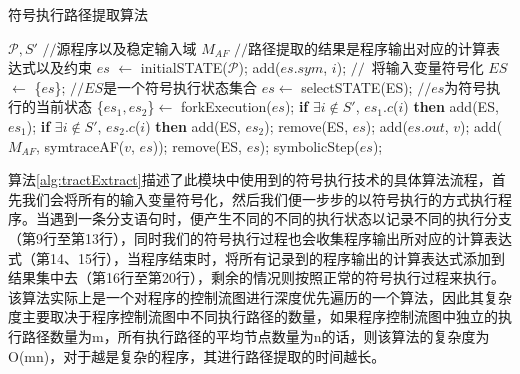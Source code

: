 \begin{algorithm}[thb]
  \caption{符号执行路径提取算法}
  \label{alg:tractExtract}
\begin{algorithmic}[1]
\REQUIRE $\mathcal{P}, S'$ \hfill {{\footnotesize$//$}\small  源程序以及稳定输入域}
\ENSURE $M_{AF}$ \hfill {{\footnotesize$//$}\small 路径提取的结果是程序输出对应的计算表达式以及约束} %
    \STATE $es$ $\leftarrow$ initialSTATE($\mathcal{P}$);
      \STATE add($es.sym$, $i$); \hfill {{\footnotesize$//$}\small\ 将输入变量符号化} \label{alg:tractExtract:input}
    \ENDFOR
    \STATE $ES$ $\leftarrow$ \{$es$\}; \hfill {{\footnotesize$//$}\small $ES$是一个符号执行状态集合}
     \label{alg:tractExtract:iter}
      \STATE $es \leftarrow$ selectSTATE(ES); \label{alg:tractExtract:select}  \hfill {{\footnotesize$//$}\small $es$为符号执行的当前状态}
        \STATE \{$es_1,es_2$\}$\leftarrow$ forkExecution($es$);
        \STATE \textbf{if} {$\exists i \notin S'$, $es_1.c$($i$)} \textbf{then} add(ES, $es_1$);
        \STATE \textbf{if} {$\exists i \notin S'$, $es_2.c$($i$)} \textbf{then} add(ES, $es_2$);
        \STATE remove(ES, $es$);   \label{alg:tractExtract:forkend}
      \ENDCASE
        \STATE add($es.out$, $v$); \label{alg:tractExtract:outputv}
      \ENDCASE
          \STATE add($M_{AF}$, symtraceAF($v$, $es$)); \label{alg:tractExtract:recordexp} %
        \ENDFOR
        \STATE remove(ES, $es$);
      \ENDCASE
      \DEFAULT
        \STATE symbolicStep($es$); \label{alg:tractExtract:propagationstep}
      \ENDDEFAULT
      \ENDSWITCH  \label{alg:tractExtract:switend}
    \ENDWHILE \label{alg:tractExtract:iterend}
\end{algorithmic}
\end{algorithm}

算法\ref{alg:tractExtract}描述了此模块中使用到的符号执行技术的具体算法流程，首先我们会将所有的输入变量符号化，然后我们便一步步的以符号执行的方式执行程序。当遇到一条分支语句时，便产生不同的不同的执行状态以记录不同的执行分支（第9行至第13行），同时我们的符号执行过程也会收集程序输出所对应的计算表达式（第14、15行），当程序结束时，将所有记录到的程序输出的计算表达式添加到结果集中去（第16行至第20行），剩余的情况则按照正常的符号执行过程来执行。
该算法实际上是一个对程序的控制流图进行深度优先遍历的一个算法，因此其复杂度主要取决于程序控制流图中不同执行路径的数量，如果程序控制流图中独立的执行路径数量为m，所有执行路径的平均节点数量为n的话，则该算法的复杂度为O(mn)，对于越是复杂的程序，其进行路径提取的时间越长。

